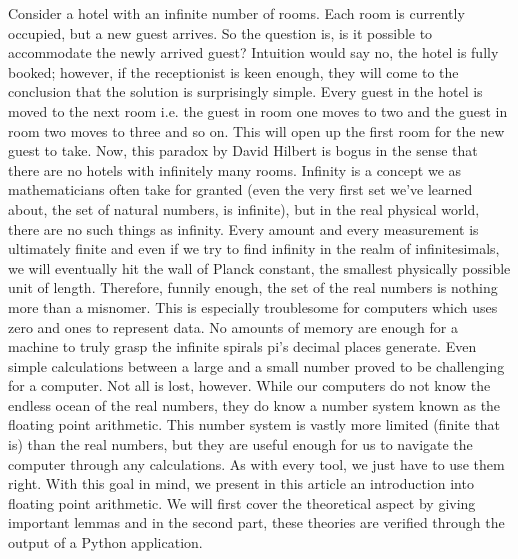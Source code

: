 Consider a hotel with an infinite number of rooms. Each room is currently occupied, but a new guest arrives. So the question is, is it possible to accommodate the newly arrived guest? Intuition would say no, the hotel is fully booked; however, if the receptionist is keen enough, they will come to the conclusion that the solution is surprisingly simple. Every guest in the hotel is moved to the next room i.e. the guest in room one moves to two and the guest in room two moves to three and so on. This will open up the first room for the new guest to take.
Now, this paradox by David Hilbert is bogus in the sense that there are no hotels with infinitely many rooms. Infinity is a concept we as mathematicians often take for granted (even the very first set we've learned about, the set of natural numbers, is infinite), but in the real physical world, there are no such things as infinity. Every amount and every measurement is ultimately finite and even if we try to find infinity in the realm of infinitesimals, we will eventually hit the wall of Planck constant, the smallest physically possible unit of length.
Therefore, funnily enough, the set of the real numbers is nothing more than a misnomer. This is especially troublesome for computers which uses zero and ones to represent data. No amounts of memory are enough for a machine to truly grasp the infinite spirals pi's decimal places generate. Even simple calculations between a large and a small number proved to be challenging for a computer. Not all is lost, however. While our computers do not know the endless ocean of the real numbers, they do know a number system known as the floating point arithmetic. This number system is vastly more limited (finite that is) than the real numbers, but they are useful enough for us to navigate the computer through any calculations. As with every tool, we just have to use them right.
With this goal in mind, we present in this article an introduction into floating point arithmetic. We will first cover the theoretical aspect by giving important lemmas and in the second part, these theories are verified through the output of a Python application.